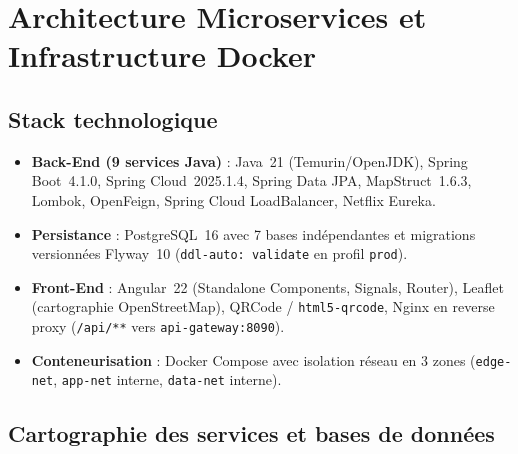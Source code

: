 \documentclass[12pt,a4paper]{report}
\begin{document}
\chapter{Architecture Microservices et Infrastructure Docker}

\section{Stack technologique}
\begin{itemize}
    \item \textbf{Back-End (9 services Java)} : Java~21 (Temurin/OpenJDK), Spring Boot~4.1.0, Spring Cloud~2025.1.4, Spring Data JPA, MapStruct~1.6.3, Lombok, OpenFeign, Spring Cloud LoadBalancer, Netflix Eureka.
    \item \textbf{Persistance} : PostgreSQL~16 avec 7 bases indépendantes et migrations versionnées Flyway~10 (\texttt{ddl-auto: validate} en profil \texttt{prod}).
    \item \textbf{Front-End} : Angular~22 (Standalone Components, Signals, Router), Leaflet (cartographie OpenStreetMap), QRCode / \texttt{html5-qrcode}, Nginx en reverse proxy (\texttt{/api/**} vers \texttt{api-gateway:8090}).
    \item \textbf{Conteneurisation} : Docker Compose avec isolation réseau en 3 zones (\texttt{edge-net}, \texttt{app-net} interne, \texttt{data-net} interne).
\end{itemize}

\section{Cartographie des services et bases de données}
\end{document}
